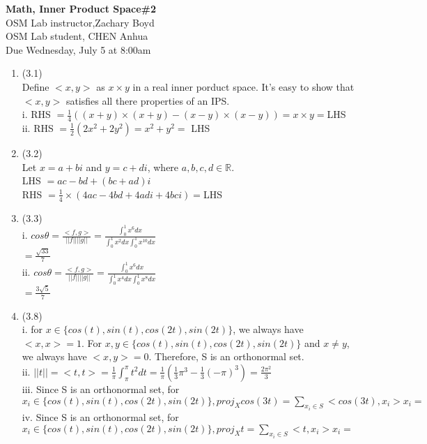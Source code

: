 \documentclass[letterpaper,12pt]{article}
\theoremstyle{definition}
\begin{document}
\begin{flushleft}
   \textbf{\large{Math, Inner Product Space\#2}} \\[5pt]
   OSM Lab instructor,Zachary Boyd \\[5pt]
   OSM Lab student, CHEN Anhua\\[5pt]
   Due Wednesday, July 5 at 8:00am
\end{flushleft}

\vspace{5mm}


\begin{enumerate}
	\item (3.1)\\
	Define $<x,y>$ as $x \times y$ in a real inner porduct space. It's easy to show that $<x, y>$ satisfies all there properties of an IPS. \\
	i.  RHS $= \frac{1}{4} ((x + y)\times (x + y) - (x-y)\times (x-y)) = x \times y = $LHS\\
	ii.  RHS $= \frac{1}{2} (2x^2 + 2y^2) = x^2 + y^2 = $ LHS\\
		
	\item(3.2)\\
	Let $x = a + bi$ and $y = c + di$, where $a, b, c, d  \in \mathbb{R}$. \\
	LHS $= ac - bd + (bc + ad)i$\\
	RHS  $= \frac{1}{4}\times(4ac - 4bd + 4adi +4bci) = $LHS\\

	\item(3.3)\\
	i. $cos\theta = \frac{<f, g>}{||f|| ||g||} = \frac{\int_{0}^{1} x^6 dx}{\int_{0}^{1} x^2 dx \int_{0}^{1} x^10 dx}$\\
	   $= \frac{\sqrt{33}}{7}$\\
	ii. $cos\theta = \frac{<f, g>}{||f|| ||g||} = \frac{\int_{0}^{1} x^6 dx}{\int_{0}^{1} x^4 dx \int_{0}^{1} x^8 dx}$\\
	   $= \frac{3\sqrt{5}}{7}$\\
	
	\item(3.8)\\
	i. for $x \in \{ cos(t), sin(t), cos(2t), sin(2t) \}$, we always have $<x, x> = 1$. For $x, y \in \{ cos(t), sin(t), cos(2t), sin(2t) \}$ and $x \neq y$, we always have $<x,y> = 0$. Therefore, S is an orthonormal set.\\
	ii. $||t|| = <t, t> = \frac{1}{\pi} \int_{\pi}^{\pi}t^2 dt = \frac{1}{\pi}(\frac{1}{3}\pi^3 -\frac{1}{3}(-\pi)^3) = \frac{2\pi^2}{3}$\\
	iii. Since S is an orthonormal set, for $x_{i} \in \{ cos(t), sin(t), cos(2t), sin(2t) \}, proj_{X}cos(3t) = \sum_{x_{i} \in S}<cos(3t), x_{i}>x_{i} = $\\
	iv. Since S is an orthonormal set, for $x_{i} \in \{ cos(t), sin(t), cos(2t), sin(2t) \}, proj_{X}t = \sum_{x_{i} \in S}<t, x_{i}>x_{i} = $\\


\end{enumerate}
\end{document}
